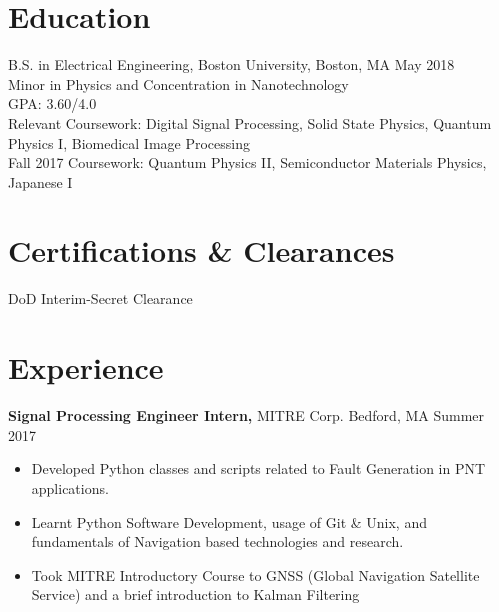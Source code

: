 \documentclass[margin]{res}
\begin{document}
 
 
\address{{\bf Present Address} \\ 39 Buswell St Apt 08 \\ Boston, MA 02215  \\
        (781) 664-7151 \\ Linkedin - http://tinyurl.com/pptgrym }
        
\address{{\bf Permanent Address} \\ 9350 Double R Blvd Apt 3814 \\ Reno, NV 89521 \\
        sonamg@bu.edu }


\begin{resume} 
 

\section{Education} 
B.S. in Electrical Engineering, Boston University, Boston, MA \hfill May 2018 \\
Minor in Physics and Concentration in Nanotechnology \\
GPA: 3.60/4.0 \\
Relevant Coursework: Digital Signal Processing, Solid State Physics, Quantum Physics I, Biomedical Image Processing \\
Fall 2017 Coursework: Quantum Physics II, Semiconductor Materials Physics, Japanese I
 
\section{Certifications \& Clearances}
DoD Interim-Secret Clearance 
\section{Experience}
 {\bf Signal Processing Engineer Intern,} MITRE Corp. Bedford, MA \hfill Summer 2017
 \begin{itemize}  pt  %
 \item Developed Python classes and scripts related to Fault Generation in PNT applications.
 \item Learnt Python Software Development, usage of Git \& Unix, and fundamentals of Navigation based technologies and research.
 \item Took MITRE Introductory Course to GNSS (Global Navigation Satellite Service) and a brief introduction to Kalman Filtering
 \end{itemize}


\end{resume}
\end{document}
